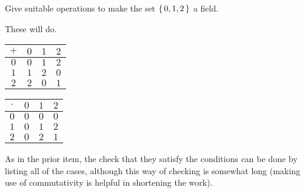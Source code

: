 \begin{exercises}
  \item 
     Give suitable operations to make the set $\mbox{$\{\,0,1,2\,\}$}$
     a field.     
     \begin{answer}
       These will do.
       \begin{center}
          \begin{tabular}{c|ccc}
             \( + \) &\( 0 \) &\( 1 \) &$2$ \\
             \hline
             \( 0 \) &\( 0 \) &\( 1 \) &$2$ \\
             \( 1 \) &\( 1 \) &\( 2 \) &$0$ \\
             $2$     &$2$     &$0$     &$1$
          \end{tabular}
          \qquad
          \begin{tabular}{c|ccc}
            \( \cdot \) &\( 0 \) &\( 1 \) &$2$ \\
            \hline
            \( 0 \)  &\( 0 \) &\( 0 \) &$0$ \\
            \( 1 \)  &\( 0 \) &\( 1 \) &$2$ \\
            $2$      &$0$     &$2$     &$1$
          \end{tabular}
       \end{center}
       As in the prior item, the check that they satisfy the conditions can 
       be done by listing all of the cases, although this way of checking is
       somewhat long (making use of commutativity is helpful in 
       shortening the work).
     \end{answer}
\end{exercises}
%
%
